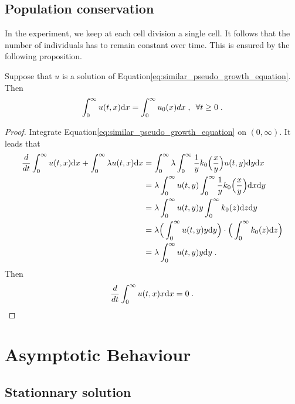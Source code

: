 \documentclass[11pt]{amsart}
\begin{document}
\subsection{Population conservation}
In the experiment, we keep at each cell division a single cell. It follows that the number of individuals has to remain constant over time. This is ensured by the following proposition.

\begin{proposition} Suppose that $u$ is a solution of Equation\eqref{eq:similar_pseudo_growth_equation}. Then
    \begin{equation*} 
        \int_0^\infty u(t,x) \mathrm dx = \int_0^\infty u_0(x) dx 
        \; , \enspace \forall t \geq 0
         \; .
    \end{equation*}
\end{proposition}
\begin{proof}
Integrate Equation\eqref{eq:similar_pseudo_growth_equation} on $(0, \infty)$. It leads that
    \begin{align*}
        \frac{d}{d t} \int_0^\infty u(t,x) \mathrm dx
        +
        \int_0^\infty \lambda u(t,x) \mathrm dx
        &=
        \int_0^\infty \lambda \int_{0}^{\infty} \frac{1}{y} k_0 \Big(\frac{x}{y} \Big) u(t,y) \mathrm dy \mathrm dx \\
	       &= 
	       \lambda \int_0^\infty  u(t,y) \int_{0}^{\infty} \frac{1}{y} k_0 \Big(\frac{x}{y} \Big) \mathrm dx \mathrm dy 	   \\
	       &= 
	       \lambda \int_0^\infty  u(t,y) y  \int_{0}^{\infty} k_0(z) \mathrm dz \mathrm dy	   \\
	       &= \lambda \Big( \int_0^\infty  u(t,y) y\mathrm dy \Big) \cdot \Big( \int_{0}^{\infty} k_0(z) \mathrm dz \Big) \\
	       &=  \lambda \int_0^\infty  u(t,y) y\mathrm dy
	       \; .
    \end{align*}
Then
    \begin{equation*}
         \frac{d}{d t} \int_0^\infty u(t,x) x \mathrm dx = 0
         \; .
    \end{equation*}
\end{proof}


\section{Asymptotic Behaviour}

\subsection{Stationnary solution}
\end{document}
